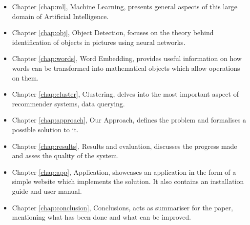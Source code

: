 \begin{itemize}
\item{Chapter \ref{chap:ml}, Machine Learning, presents general aspects of this large domain of Artificial Intelligence.}
\item{Chapter \ref{chap:obj}, Object Detection, focuses on the theory behind identification of objects in pictures using neural networks.}
\item{Chapter \ref{chap:words}, Word Embedding, provides useful information on how words can be transformed into mathematical objects which allow operations on them.}
\item{Chapter \ref{chap:cluster}, Clustering, delves into the most important aspect of recommender systems, data querying.}
\item{Chapter \ref{chap:approach}, Our Approach, defines the problem and formalises a possible solution to it.}
\item{Chapter \ref{chap:results}, Results and evaluation, discusses the progress made and asses the quality of the system.}
\item{Chapter \ref{chap:app}, Application, showcases an application in the form of a simple website which implements the solution. It also contains an installation guide and user manual.}
\item{Chapter \ref{chap:conclusion}, Conclusions, acts as summariser for the paper, mentioning what has been done and what can be improved.}
\end{itemize}